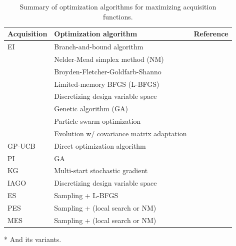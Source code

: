 \documentclass[iicol,sn-basic]{sn-jnl}%
\begin{document}
\begin{table}[t]
  \centering
  \begin{threeparttable}
	\caption{Summary of optimization algorithms for maximizing acquisition functions.}
	\begin{tabularx}{\textwidth}{lXX}
      \toprule
      Acquisition & Optimization algorithm & Reference\\
      \midrule
      EI\tnote{*} & Branch-and-bound algorithm & \cite{Jones1998}\\
                  & Nelder-Mead simplex method (NM) & \cite{Huang2006smo,Huang2006jgo}\\
                  & Broyden-Fletcher-Goldfarb-Shanno & \cite{Sobester2005}\\
                  & Limited-memory BFGS (L-BFGS) & \cite{Frazier2018,Bonfiglio2018b}\\
                  & Discretizing design variable space & \cite{Ghoreishi2019,Grassi2023}\\
                  & Genetic algorithm (GA) & \cite{Forrester2007,Chen2016,ZhangY2018,Bailly2019,Do2022}\\
                  & Particle swarm optimization & \cite{Kontogiannis2020b,Ribeiro2023}\\
                  & Evolution w/ covariance matrix adaptation & \cite{Tran2020jcp,Tran2020cise}\\
      GP-UCB\tnote{*} & Direct optimization algorithm & \cite{Kandasamy2016,Kandasamy2017}\\
      PI\tnote{*} & GA & \cite{Ruan2020}\\
      KG & Multi-start stochastic gradient& \cite{WuJ2016}\\
      IAGO & Discretizing design variable space & \cite{Villemonteix2009}\\
      ES & Sampling + L-BFGS & \cite{Hennig2012}\\
      PES & Sampling + (local search or NM)& \cite{HernandezLobato2014}\\
      MES & Sampling + (local search or NM)& \cite{WangZ2017}\\
      \bottomrule
	\end{tabularx}
    \begin{tablenotes}
    \item[*] \small{And its variants.}
    \end{tablenotes}
  \label{Table5}
  \end{threeparttable}
\end{table}
\end{document}
